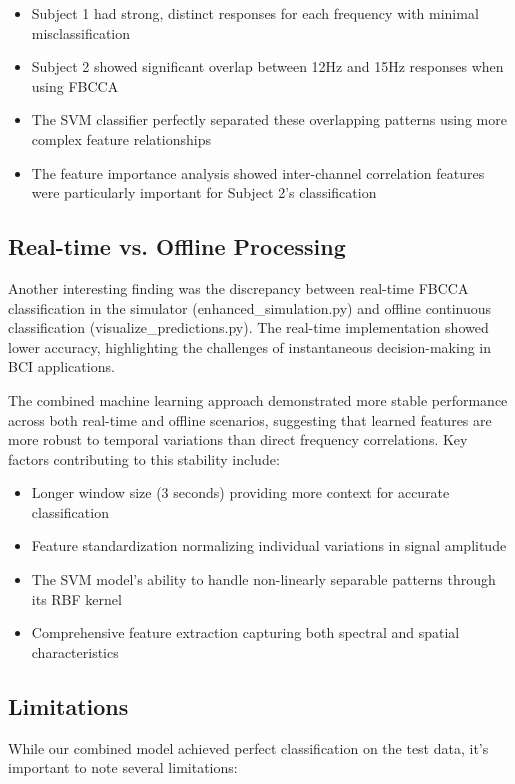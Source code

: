 \documentclass[conference]{IEEEtran}
\begin{document}
\begin{itemize}
    \item Subject 1 had strong, distinct responses for each frequency with minimal misclassification
    \item Subject 2 showed significant overlap between 12Hz and 15Hz responses when using FBCCA
    \item The SVM classifier perfectly separated these overlapping patterns using more complex feature relationships
    \item The feature importance analysis showed inter-channel correlation features were particularly important for Subject 2's classification
\end{itemize}

\subsection{Real-time vs. Offline Processing}
Another interesting finding was the discrepancy between real-time FBCCA classification in the simulator (enhanced\_simulation.py) and offline continuous classification (visualize\_predictions.py). The real-time implementation showed lower accuracy, highlighting the challenges of instantaneous decision-making in BCI applications.

The combined machine learning approach demonstrated more stable performance across both real-time and offline scenarios, suggesting that learned features are more robust to temporal variations than direct frequency correlations. Key factors contributing to this stability include:

\begin{itemize}
    \item Longer window size (3 seconds) providing more context for accurate classification
    \item Feature standardization normalizing individual variations in signal amplitude
    \item The SVM model's ability to handle non-linearly separable patterns through its RBF kernel
    \item Comprehensive feature extraction capturing both spectral and spatial characteristics
\end{itemize}

\subsection{Limitations}
While our combined model achieved perfect classification on the test data, it's important to note several limitations:
\end{document}
